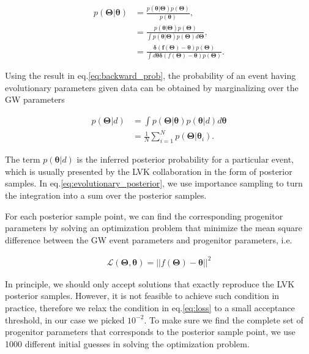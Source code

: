 \documentclass[twocolumn]{aastex631}
\begin{document}
\begin{align}
    p(\bm{\Theta}|\bm{\theta}) &= \frac{p(\bm{\theta}|\bm{\Theta})p(\bm{\Theta})}{p(\bm{\theta})}, \nonumber \\
    &= \frac{p(\bm{\theta}|\bm{\Theta})p(\bm{\Theta})}{\int p(\bm{\theta}|\bm{\Theta}) p(\bm{\Theta}) d\bm{\Theta}}, \nonumber \\
    &= \frac{\bm{\delta}(\bm{f}(\bm{\Theta})-\bm{\theta})p(\bm{\Theta})}{\int d\bm{\theta} \bm{\delta}(f(\bm{\Theta})-\bm{\theta})p(\bm{\Theta})}.
\label{eq:backward_prob}
\end{align}

Using the result in eq.\ref{eq:backward_prob},
the probability of an event having evolutionary parameters given data can be obtained by marginalizing over the GW parameters

\begin{align}
    p(\bm{\Theta}|d) &= \int p(\bm{\Theta}|\bm{\theta}) p(\bm{\theta}|d) d\bm{\theta}\\
    &= \frac{1}{N}\sum_{i=1}^{N} p(\bm{\Theta}|\bm{\theta}_i). \label{eq:evolutionary_posterior}
\end{align}

The term $p(\bm{\theta}|d)$ is the inferred posterior probability for a particular event, which is usually presented by the LVK collaboration in the form of posterior samples.
In eq.\ref{eq:evolutionary_posterior}, we use importance sampling to turn the integration into a sum over the posterior samples.

For each posterior sample point, we can find the corresponding progenitor parameters by solving an optimization problem that minimize the mean square difference between the GW event parameters and progenitor parameters, i.e. 

\begin{align}
\mathcal{L}(\bm{\Theta},\bm{\theta}) = ||f(\bm{\Theta})-\bm{\theta}||^2
\label{eq:loss}
\end{align}

In principle, we should only accept solutions that exactly reproduce the LVK posterior samples.
However, it is not feasible to achieve such condition in practice, therefore we relax the condition in eq.\ref{eq:loss} to a small acceptance threshold, in our case we picked $10^{-2}$.
To make sure we find the complete set of progenitor parameters that corresponds to the posterior sample point, we use 1000 different initial guesses in solving the optimization problem.
\end{document}
